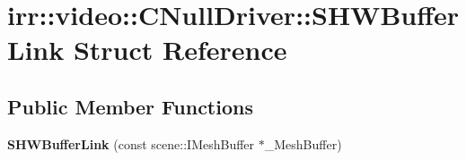 \hypertarget{structirr_1_1video_1_1_c_null_driver_1_1_s_h_w_buffer_link}{\section{irr\-:\-:video\-:\-:C\-Null\-Driver\-:\-:S\-H\-W\-Buffer\-Link Struct Reference}
\label{structirr_1_1video_1_1_c_null_driver_1_1_s_h_w_buffer_link}
}
\subsection*{Public Member Functions}
\begin{DoxyCompactItemize}
\item 
\hypertarget{structirr_1_1video_1_1_c_null_driver_1_1_s_h_w_buffer_link_af118f1ac5006f0ddac76f5ac265ce3b7}{{\bfseries S\-H\-W\-Buffer\-Link} (const scene\-::\-I\-Mesh\-Buffer $\ast$\-\_\-\-Mesh\-Buffer)}\label{structirr_1_1video_1_1_c_null_driver_1_1_s_h_w_buffer_link_af118f1ac5006f0ddac76f5ac265ce3b7}

\end{DoxyCompactItemize}
